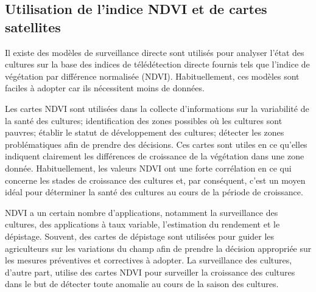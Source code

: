 \documentclass[12pt, openany]{report}
\begin{document}
\subsection{Utilisation de l'indice NDVI et de cartes satellites}

Il existe des modèles de surveillance directe sont utilisés pour analyser l'état des cultures sur la base des indices de télédétection directe fournis tels que l'indice de végétation par différence normalisée (NDVI). Habituellement, ces modèles sont faciles à adopter car ils nécessitent moins de données.

Les cartes NDVI sont utilisées dans la collecte d'informations sur la variabilité de la santé des cultures; identification des zones possibles où les cultures sont pauvres; établir le statut de développement des cultures; détecter les zones problématiques afin de prendre des décisions. Ces cartes sont utiles en ce qu'elles indiquent clairement les différences de croissance de la végétation dans une zone donnée. Habituellement, les valeurs NDVI ont une forte corrélation en ce qui concerne les stades de croissance des cultures et, par conséquent, c'est un moyen idéal pour déterminer la santé des cultures au cours de la période de croissance.

NDVI a un certain nombre d'applications, notamment la surveillance des cultures, des applications à taux variable, l'estimation du rendement et le dépistage. Souvent, des cartes de dépistage sont utilisées pour guider les agriculteurs sur les variations du champ afin de prendre la décision appropriée sur les mesures préventives et correctives à adopter. La surveillance des cultures, d'autre part, utilise des cartes NDVI pour surveiller la croissance des cultures dans le but de détecter toute anomalie au cours de la saison des cultures.
\end{document}
